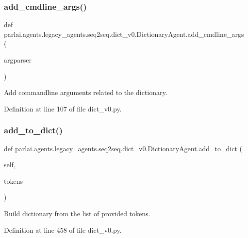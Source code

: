 \subsubsection{\texorpdfstring{add\+\_\+cmdline\+\_\+args()}{add\_cmdline\_args()}}
{\footnotesize\ttfamily def parlai.\+agents.\+legacy\+\_\+agents.\+seq2seq.\+dict\+\_\+v0.\+Dictionary\+Agent.\+add\+\_\+cmdline\+\_\+args (\begin{DoxyParamCaption}\item[{}]{argparser }\end{DoxyParamCaption})\hspace{0.3cm}{\ttfamily [static]}}

\begin{DoxyVerb}Add commandline arguments related to the dictionary.\end{DoxyVerb}
 

Definition at line 107 of file dict\+\_\+v0.\+py.

\mbox{\label{classparlai_1_1agents_1_1legacy__agents_1_1seq2seq_1_1dict__v0_1_1DictionaryAgent_aeae5dabd12a2ab943f75d01a1dbb091c}} 
\subsubsection{\texorpdfstring{add\+\_\+to\+\_\+dict()}{add\_to\_dict()}}
{\footnotesize\ttfamily def parlai.\+agents.\+legacy\+\_\+agents.\+seq2seq.\+dict\+\_\+v0.\+Dictionary\+Agent.\+add\+\_\+to\+\_\+dict (\begin{DoxyParamCaption}\item[{}]{self,  }\item[{}]{tokens }\end{DoxyParamCaption})}

\begin{DoxyVerb}Build dictionary from the list of provided tokens.\end{DoxyVerb}
 

Definition at line 458 of file dict\+\_\+v0.\+py.



